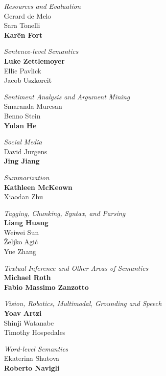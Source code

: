 \emph{Resources and Evaluation}\\
\hspace*{5mm}Gerard de Melo \\
\hspace*{5mm}Sara Tonelli \\
\hspace*{5mm}\textbf{Karën Fort}

\emph{Sentence-level Semantics} \\
\hspace*{5mm}\textbf{Luke Zettlemoyer} \\
\hspace*{5mm}Ellie Pavlick \\
\hspace*{5mm}Jacob Uszkoreit

\emph{Sentiment Analysis and Argument Mining} \\
\hspace*{5mm}Smaranda Muresan \\
\hspace*{5mm}Benno Stein \\
\hspace*{5mm}\textbf{Yulan He}

\emph{Social Media}\\
\hspace*{5mm}David Jurgens \\
\hspace*{5mm}\textbf{Jing Jiang}

\emph{Summarization}\\
\hspace*{5mm}\textbf{Kathleen McKeown} \\
\hspace*{5mm}Xiaodan Zhu

\emph{Tagging, Chunking, Syntax, and Parsing} \\
\hspace*{5mm}\textbf{Liang Huang} \\
\hspace*{5mm}Weiwei Sun \\
\hspace*{5mm}Željko Agić \\
\hspace*{5mm}Yue Zhang

\emph{Textual Inference and Other Areas of Semantics}\\
\hspace*{5mm}\textbf{Michael Roth} \\
\hspace*{5mm}\textbf{Fabio Massimo Zanzotto}

\emph{Vision, Robotics, Multimodal, Grounding and Speech}\\
\hspace*{5mm}\textbf{Yoav Artzi} \\
\hspace*{5mm}Shinji Watanabe \\
\hspace*{5mm}Timothy Hospedales

\emph{Word-level Semantics}\\
\hspace*{5mm}Ekaterina Shutova \\
\hspace*{5mm}\textbf{Roberto Navigli}

